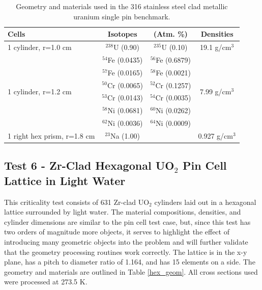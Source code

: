\documentclass[preprint,12pt]{elsarticle}
\begin{document}
\begin{table}[h]
\centering
\caption{Geometry and materials used in the 316 stainless steel clad metallic uranium single pin benchmark.}
\label{sodium_geom}
\begin{tabular}{| l | c  c  | c |}
\hline
Cells & Isotopes & (Atm. \%)     & Densities \\
\hline
\multirow{1}{*}{1 cylinder, r=1.0 cm }   &  $^{238}$U   (0.90)   & $^{235}$U   (0.10)   &    \multirow{1}{*}{19.1 g/cm$^3$} \\
\hline
\multirow{6}{*}{1 cylinder, r=1.2 cm }   &  $^{54}$Fe  (0.0435) & $^{56}$Fe  (0.6879)  &   \multirow{6}{*}{7.99 g/cm$^3$} \\
                                         &  $^{57}$Fe  (0.0165) & $^{58}$Fe  (0.0021)  &   \\
                                         &  $^{50}$Cr  (0.0065) & $^{52}$Cr  (0.1257)  &   \\
                                         &  $^{53}$Cr  (0.0143) & $^{54}$Cr  (0.0035)  &   \\
                                         &  $^{58}$Ni  (0.0681) & $^{60}$Ni  (0.0262)  &   \\
                                         &  $^{62}$Ni  (0.0036) &  $^{64}$Ni  (0.0009) &   \\
\hline
1 right hex prism, r=1.8 cm              &  $^{23}$Na   (1.00)  &                      &    0.927 g/cm$^3$ \\
\hline
\end{tabular}
\end{table}


\subsection{Test 6 - Zr-Clad Hexagonal UO$_2$ Pin Cell Lattice in Light Water}

This criticality test consists of 631 Zr-clad UO$_2$ cylinders laid out in a hexagonal lattice surrounded by light water.  The material compositions, densities, and cylinder dimensions are similar to the pin cell test case, but, since this test has two orders of magnitude more objects, it serves to highlight the effect of introducing many geometric objects into the problem and will further validate that the geometry processing routines work correctly.  The lattice is in the x-y plane, has a pitch to diameter ratio of 1.164, and has 15 elements on a side.  The geometry and materials are outlined in Table \ref{hex_geom}.  All cross sections used were processed at 273.5 K.
\end{document}
